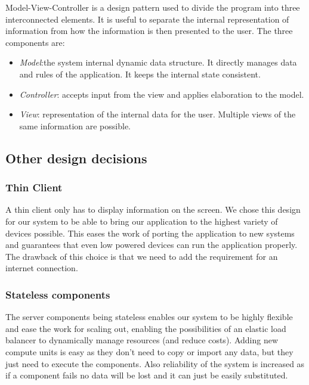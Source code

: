 \documentclass{article}
\begin{document}
    Model-View-Controller is a design pattern used to divide the program into three interconnected elements. It is useful to separate the internal representation of information from how the information is then presented to the user. The three components are:

    \begin{itemize}
        \item \textit{Model}:the system internal dynamic data structure. It directly manages data and rules of the application. It keeps the internal state consistent.
        \item \textit{Controller}: accepts input from the view and applies elaboration to the model.
        \item \textit{View}: representation of the internal data for the user. Multiple views of the same information are possible.
    \end{itemize}
    


\newpage


\subsection{Other design decisions}

    \subsubsection{Thin Client}
    A thin client only has to display information on the screen. We chose this design for our system to be able to bring our application to the highest variety of devices possible. This eases the work of porting the application to new systems and guarantees that even low powered devices can run the application properly. The drawback of this choice is that we need to add the requirement for an internet connection.

    \subsubsection{Stateless components}
    The server components being stateless enables our system to be highly flexible and ease the work for scaling out, enabling the possibilities of an elastic load balancer to dynamically manage resources (and reduce costs). Adding new compute units is easy as they don’t need to copy or import any data, but they just need to execute the components. Also reliability of the system is increased as if a component fails no data will be lost and it can just be easily substituted.
\end{document}
